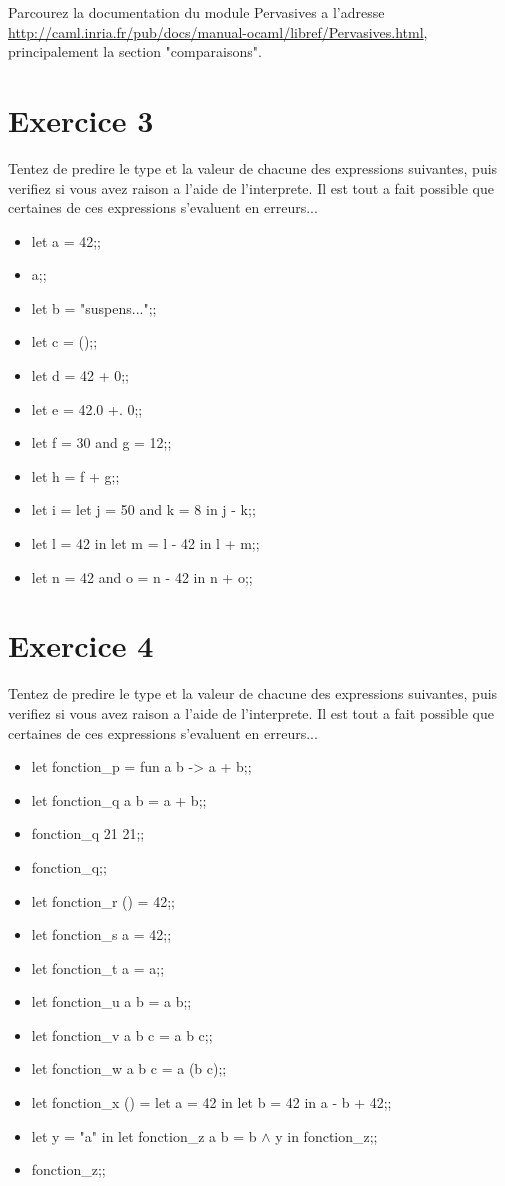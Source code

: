 \documentclass{life-fr}
\begin{document}
    Parcourez la documentation du module Pervasives a l'adresse
  \url{http://caml.inria.fr/pub/docs/manual-ocaml/libref/Pervasives.html},
  principalement la section "comparaisons".

  \section{Exercice 3}

    Tentez de predire le type et la valeur de chacune des expressions suivantes,
  puis verifiez si vous avez raison a l'aide de l'interprete. Il est tout a fait
  possible que certaines de ces expressions s'evaluent en erreurs...

  \begin{itemize}
    \item let a = 42;;
    \item a;;
    \item let b = "suspens...";;
    \item let c = ();;
    \item let d = 42 + 0;;
    \item let e = 42.0 +. 0;;
    \item let f = 30 and g = 12;;
    \item let h = f + g;;
    \item let i = let j = 50 and k = 8 in j - k;;
    \item let l = 42 in let m = l - 42 in l + m;;
    \item let n = 42 and o = n - 42 in n + o;;
  \end{itemize}


  \section{Exercice 4}

    Tentez de predire le type et la valeur de chacune des expressions suivantes,
  puis verifiez si vous avez raison a l'aide de l'interprete. Il est tout a fait
  possible que certaines de ces expressions s'evaluent en erreurs...

  \begin{itemize}
    \item let fonction\_p = fun a b -> a + b;;
    \item let fonction\_q a b = a + b;;
    \item fonction\_q 21 21;;
    \item fonction\_q;;
    \item let fonction\_r () = 42;;
    \item let fonction\_s a = 42;;
    \item let fonction\_t a = a;;
    \item let fonction\_u a b = a b;;
    \item let fonction\_v a b c = a b c;;
    \item let fonction\_w a b c = a (b c);;
    \item let fonction\_x () = let a = 42 in let b = 42 in a - b + 42;;
    \item let y = "a" in let fonction\_z a b = b $\wedge$ y in fonction\_z;;
    \item fonction\_z;;
  \end{itemize}
\end{document}
